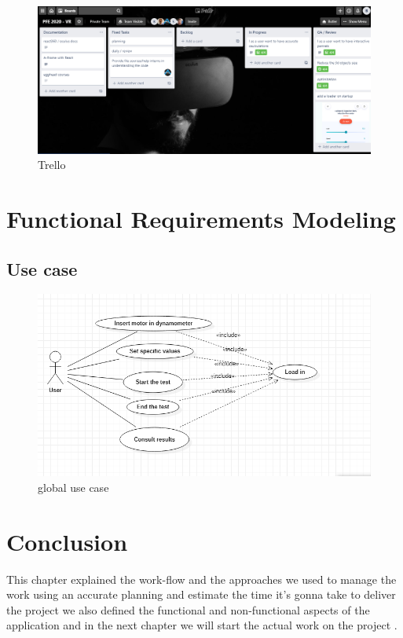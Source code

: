 \documentclass[]{report}
\begin{document}
\begin{figure}[H]
	\begin{center}
		\includegraphics[scale=0.5, frame]{Trello.png}
		\caption{Trello}
	\end{center}
\end{figure}

\section{Functional Requirements Modeling}
\subsection{Use case}

\begin{figure}[H]
		\includegraphics[scale=0.8, frame]{useCase.png}
		\caption{global use case}
\end{figure}

\section{Conclusion}
This chapter explained the work-flow and the approaches
we used to manage the work using an accurate planning and
estimate the time it’s gonna take to deliver the project we
also defined the functional and non-functional aspects of
the application and in the next chapter we will start the
actual work on the project .
\end{document}
